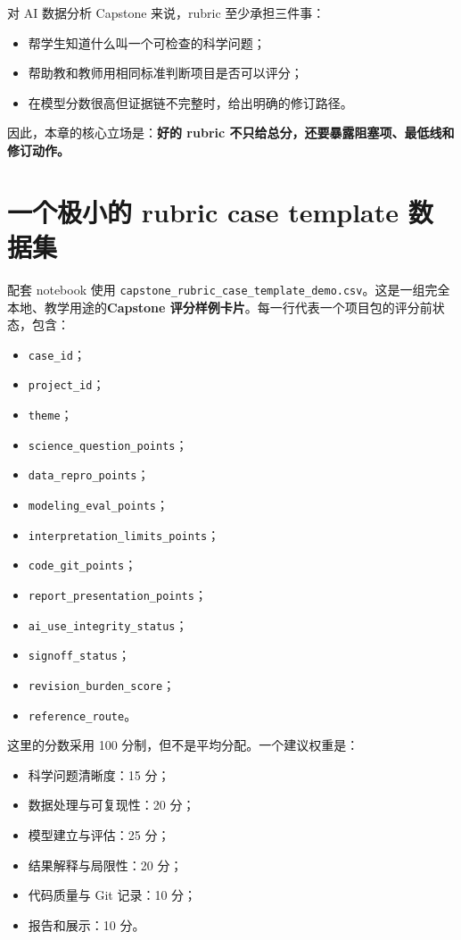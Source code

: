 对 AI 数据分析 Capstone 来说，rubric 至少承担三件事：

\begin{itemize}
    \item 帮学生知道什么叫一个可检查的科学问题；
    \item 帮助教和教师用相同标准判断项目是否可以评分；
    \item 在模型分数很高但证据链不完整时，给出明确的修订路径。
\end{itemize}

因此，本章的核心立场是：\textbf{好的 rubric 不只给总分，还要暴露阻塞项、最低线和修订动作。}

\section{一个极小的 rubric case template 数据集}

配套 notebook 使用 \nolinkurl{capstone_rubric_case_template_demo.csv}。这是一组完全本地、教学用途的\textbf{Capstone 评分样例卡片}。每一行代表一个项目包的评分前状态，包含：

\begin{itemize}
    \item \texttt{case\_id}；
    \item \texttt{project\_id}；
    \item \texttt{theme}；
    \item \texttt{science\_question\_points}；
    \item \texttt{data\_repro\_points}；
    \item \texttt{modeling\_eval\_points}；
    \item \texttt{interpretation\_limits\_points}；
    \item \texttt{code\_git\_points}；
    \item \texttt{report\_presentation\_points}；
    \item \texttt{ai\_use\_integrity\_status}；
    \item \texttt{signoff\_status}；
    \item \texttt{revision\_burden\_score}；
    \item \texttt{reference\_route}。
\end{itemize}

这里的分数采用 100 分制，但不是平均分配。一个建议权重是：

\begin{itemize}
    \item 科学问题清晰度：15 分；
    \item 数据处理与可复现性：20 分；
    \item 模型建立与评估：25 分；
    \item 结果解释与局限性：20 分；
    \item 代码质量与 Git 记录：10 分；
    \item 报告和展示：10 分。
\end{itemize}

